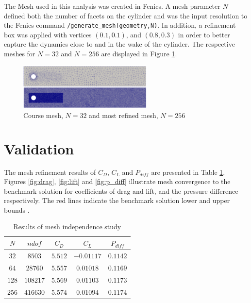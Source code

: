 \documentclass{article}
\begin{document}
The Mesh used in this analysis was created in Fenics. A mesh parameter $N$ defined both the number of facets on the cylinder and was the input resolution to the Fenics command \verb|/generate_mesh(geometry,N)|. In addition, a refinement box was applied with vertices $(0.1, 0.1)$, and $(0.8, 0.3)$ in order to better capture the dynamics close to and in the wake of the cylinder. The respective meshes for $N = 32$ and $N = 256$ are displayed in Figure \ref{fig:mesh}. 

\FloatBarrier
\begin{figure}[h]
\centering
	\includegraphics[width=0.6\textwidth]{mesh}
	\caption{Course mesh, $N = 32$ and most refined mesh, $N = 256$}
	\label{fig:mesh}
\end{figure}
\FloatBarrier

\section{Validation} 

The mesh refinement results of $C_D$, $C_L$ and $P_{diff}$ are presented in Table \ref{tab:fluid}. Figures \ref{fig:drag}, \ref{fig:lift} and \ref{fig:p_diff} illustrate mesh convergence to the benchmark solution for coefficients of drag and lift, and the pressure difference respectively. The red lines indicate the benchmark solution lower and upper bounds \cite{schafer1996benchmark}.   

\FloatBarrier
  \begin{table}[htbp]
  \setlength\extrarowheight{5pt}
  \centering
  \caption{Results of mesh independence study}
    \begin{tabular}{ccccc}
    \toprule
    $N$ & $ndof$ & $C_D$ & $C_L$ & $P_{diff}$ \\
    \midrule
$32$ & $8503$ & $5.512$ & $-0.01117$ & $0.1142$ \\
$64$ & $28760$ & $5.557$ & $0.01018$ & $0.1169$ \\
$128$ & $108217$ & $5.569$ & $0.01103$ & $0.1173$ \\
$256$ & $416630$ & $5.574$ & $0.01094$ & $0.1174$ \\
    \bottomrule
    \end{tabular}%
  \label{tab:fluid}%
\end{table}%
\FloatBarrier
\end{document}

